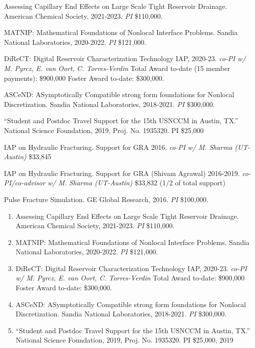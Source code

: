 \begin{etaremune}
    \item Assessing Capillary End Effects on Large Scale Tight Reservoir Drainage.  American Chemical Society, 2021-2023. \textit{PI} \$110,000.
    \item MATNIP: Mathematical Foundations of Nonlocal Interface Problems. Sandia National Laboratories, 2020-2022. \textit{PI} \$121,000. 
    \item DiReCT: Digital Reservoir Characterization Technology IAP, 2020-23. \textit{co-PI w/ M. Pyrcz, E. van Oort, C. Torres-Verdin} Total Award to-date (15 member payments): \$900,000 Foster Award to-date: \$300,000.
    \item ASCeND: ASymptotically Compatible strong form foundations for Nonlocal Discretization. Sandia National Laboratories, 2018-2021. \textit{PI} \$300,000.
    \item ``Student and Postdoc Travel Support for the 15th USNCCM in Austin, TX.''  National Science Foundation, 2019, Proj. No. 1935320. PI \$25,000
  \item IAP on Hydraulic Fracturing.  Support for GRA 2016. \textit{co-PI w/ M. Sharma (UT-Austin)} \$33,845
  \item IAP on Hydraulic Fracturing.  Support for GRA (Shivam Agrawal) 2016-2019. \textit{co-PI/co-advisor w/ M. Sharma (UT-Austin)} \$33,832 (1/2 of total support)
    \item Pulse Fracture Simulation. GE Global Research, 2016. \textit{PI} \$100,000.
\else
\begin{enumerate}
\fi
    \item Assessing Capillary End Effects on Large Scale Tight Reservoir Drainage.  American Chemical Society, 2021-2023. \textit{PI} \$110,000.
  \item MATNIP: Mathematical Foundations of Nonlocal Interface Problems. Sandia National Laboratories, 2020-2022. \textit{PI} \$121,000. 
    \item DiReCT: Digital Reservoir Characterization Technology IAP, 2020-23. \textit{co-PI w/ M. Pyrcz, E. van Oort, C. Torres-Verdin} Total Award to-date: \$900,000 Foster Award to-date: \$300,000.
  \item ASCeND: ASymptotically Compatible strong form foundations for Nonlocal Discretization. Sandia National Laboratories, 2018-2021. \textit{PI} \$300,000.
    \item ``Student and Postdoc Travel Support for the 15th USNCCM in Austin, TX.''  National Science Foundation, 2019, Proj. No. 1935320. PI \$25,000, 2019

\end{enumerate}
\end{etaremune}
